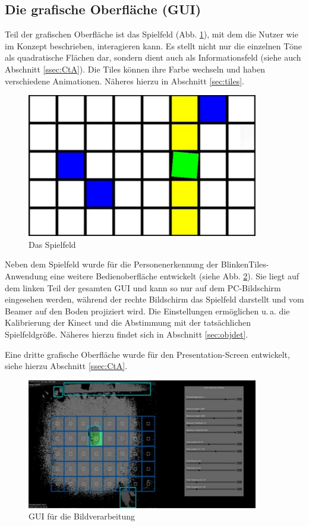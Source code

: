 \subsection{Die grafische Oberfläche (GUI)}
\label{gui}

Teil der grafischen Oberfläche ist das Spielfeld (Abb. \ref{fig:gui-tiles}), mit dem die Nutzer wie im Konzept beschrieben, interagieren kann. Es stellt nicht nur die einzelnen Töne als quadratische Flächen dar, sondern dient auch als Informationsfeld (siehe auch Abschnitt \ref{ssec:CtA}). Die Tiles können ihre Farbe wechseln und haben verschiedene Animationen. Näheres hierzu in Abschnitt \ref{sec:tiles}.

\begin{figure}[htbp] 
  \centering
     \includegraphics[width=0.9\textwidth]{images/gui-tiles}
  \caption{Das Spielfeld}
  \label{fig:gui-tiles}
\end{figure}

Neben dem Spielfeld wurde für die Personenerkennung der BlinkenTiles-Anwendung eine weitere Bedienoberfläche entwickelt (siehe Abb. \ref{fig:blob}). Sie liegt auf dem linken Teil der gesamten GUI und kann so nur auf dem PC-Bildschirm eingesehen werden, während der rechte Bildschirm das Spielfeld darstellt und vom Beamer auf den Boden projiziert wird. Die Einstellungen ermöglichen u.\,a.  die Kalibrierung der Kinect und die Abstimmung mit der tatsächlichen Spielfeldgröße. Näheres hierzu findet sich in Abschnitt \ref{sec:objdet}.

Eine dritte grafische Oberfläche wurde für den Presentation-Screen entwickelt, siehe hierzu Abschnitt \ref{ssec:CtA}.

\begin{figure}[htbp] 
  \centering
     \includegraphics[width=0.9\textwidth]{images/Blob}
  \caption{GUI für die Bildverarbeitung}
  \label{fig:blob}
\end{figure}

\newpage